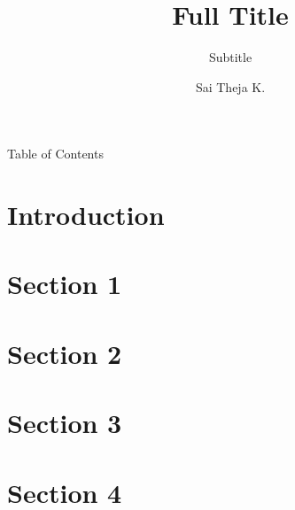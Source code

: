 \documentclass[aspectratio=169, 10pt, notes]{beamer}
\title[Short Title]{Full Title}
\subtitle{Subtitle}
\author[Sai Theja K.]{Sai Theja K.}
\institute[Fluidyn]{Fluidyn Inc.}
\date{} %
\begin{document}
\frame{\titlepage}


\section[Outline]{}

\begin{frame}{Table of Contents}
    \begin{multicols}{2}
        \tableofcontents
    \end{multicols}    
\end{frame}

\section[Introduction]{Introduction}

\section[Section 1]{Section 1}

\section[Section 2]{Section 2}

\section[Section 3]{Section 3}

\section[Section 4]{Section 4}
\end{document}
